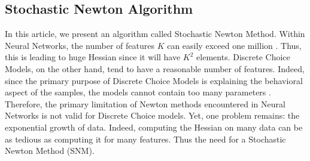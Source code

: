 \documentclass[conference]{IEEEtran}
\begin{document}
\subsection{Stochastic Newton Algorithm}
\label{sec:snm}

In this article, we present an algorithm called Stochastic Newton Method. Within Neural Networks, the number of features $K$ can easily exceed one million . Thus, this is leading to huge Hessian since it will have $K^2$ elements. Discrete Choice Models, on the other hand, tend to have a reasonable number of features. Indeed, since the primary purpose of Discrete Choice Models is explaining the behavioral aspect of the samples, the models cannot contain too many parameters . Therefore, the primary limitation of Newton methods encountered in Neural Networks is not valid for Discrete Choice models. Yet, one problem remains: the exponential growth of data. Indeed, computing the Hessian on many data can be as tedious as computing it for many features. Thus the need for a Stochastic Newton Method (SNM).
\end{document}
